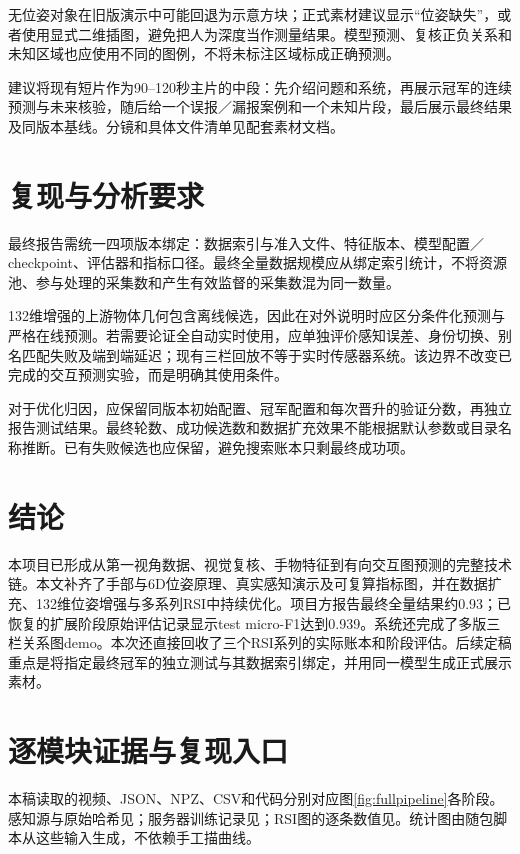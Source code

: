 无位姿对象在旧版演示中可能回退为示意方块；正式素材建议显示“位姿缺失”，或者使用显式二维插图，避免把人为深度当作测量结果。模型预测、复核正负关系和未知区域也应使用不同的图例，不将未标注区域标成正确预测。

建议将现有短片作为90--120秒主片的中段：先介绍问题和系统，再展示冠军的连续预测与未来核验，随后给一个误报／漏报案例和一个未知片段，最后展示最终结果及同版本基线。分镜和具体文件清单见配套素材文档。

\section{复现与分析要求}
最终报告需统一四项版本绑定：数据索引与准入文件、特征版本、模型配置／checkpoint、评估器和指标口径。最终全量数据规模应从绑定索引统计，不将资源池、参与处理的采集数和产生有效监督的采集数混为同一数量。

132维增强的上游物体几何包含离线候选，因此在对外说明时应区分条件化预测与严格在线预测。若需要论证全自动实时使用，应单独评价感知误差、身份切换、别名匹配失败及端到端延迟；现有三栏回放不等于实时传感器系统。该边界不改变已完成的交互预测实验，而是明确其使用条件。

对于优化归因，应保留同版本初始配置、冠军配置和每次晋升的验证分数，再独立报告测试结果。最终轮数、成功候选数和数据扩充效果不能根据默认参数或目录名称推断。已有失败候选也应保留，避免搜索账本只剩最终成功项。

\section{结论}
本项目已形成从第一视角数据、视觉复核、手物特征到有向交互图预测的完整技术链。本文补齐了手部与6D位姿原理、真实感知演示及可复算指标图，并在数据扩充、132维位姿增强与多系列RSI中持续优化。项目方报告最终全量结果约0.93；已恢复的扩展阶段原始评估记录显示test micro-F1达到0.939。系统还完成了多版三栏关系图demo。本次还直接回收了三个RSI系列的实际账本和阶段评估。后续定稿重点是将指定最终冠军的独立测试与其数据索引绑定，并用同一模型生成正式展示素材。

\FloatBarrier\medskip
{}
{\small}
\clearpage\appendix
\section{逐模块证据与复现入口}
本稿读取的视频、JSON、NPZ、CSV和代码分别对应图\ref{fig:fullpipeline}各阶段。感知源与原始哈希见；服务器训练记录见；RSI图的逐条数值见。统计图由随包脚本从这些输入生成，不依赖手工描曲线。

